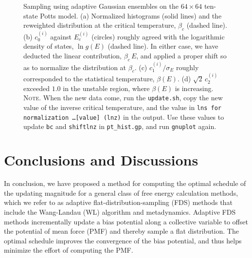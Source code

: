 \documentclass[reprint, superscriptaddress, floatfix]{revtex4-1}
\newcommand{\note}[1]{{\color{DarkGreen}\footnotesize \textsc{Note.} #1}}
\begin{document}
\begin{figure}[h]\centering
  \caption{
    \label{fig:pt_hist}
    Sampling using adaptive Gaussian ensembles
    on the $64 \times 64$ ten-state Potts model.
    (a) Normalized histograms (solid lines)
    and the reweighted distribution
    at the critical temperature, $\beta_c$ (dashed line).
    (b) $c_0^{(i)}$ against $E_c^{(i)}$ (circles)
    roughly agreed with the logarithmic density of states,
    $\ln g(E)$ (dashed line).
    In either case,
    we have deducted the linear contribution, $\beta_c \, E$,
    and applied a proper shift so as to normalize
    the distribution at $\beta_c$.
    (c) $c_1^{(i)}/\sigma_E$ roughly corresponded to
    the statistical temperature, $\beta(E)$.
    (d) $\sqrt 2 \, c_2^{(i)}$
    exceeded $1.0$ in the unstable region,
    where $\beta(E)$ is increasing.
    \note{When the new data come,
    run the \texttt{update.sh},
    copy the new value of the inverse critical temperature,
    and the value in \texttt{lns for normalization \dots [value] (lnz)}
    in the output.
    Use these values to update \texttt{bc} and \texttt{shiftlnz}
    in \texttt{pt\_hist.gp}, and run \texttt{gnuplot} again.  }%
  }
\end{figure}


\section{\label{sec:conclusion}
Conclusions and Discussions}



In conclusion,
we have proposed a method for computing
the optimal schedule of the updating magnitude
for a general class of free energy calculation methods,
which we refer to as adaptive flat-distribution-sampling (FDS) methods
that include the Wang-Landau (WL) algorithm and metadynamics.
%
Adaptive FDS methods
incrementally update a bias potential
along a collective variable
to offset the potential of mean force (PMF)
and thereby sample a flat distribution.
%
The optimal schedule improves the convergence
of the bias potential,
and thus helps minimize the effort
of computing the PMF.
\end{document}
